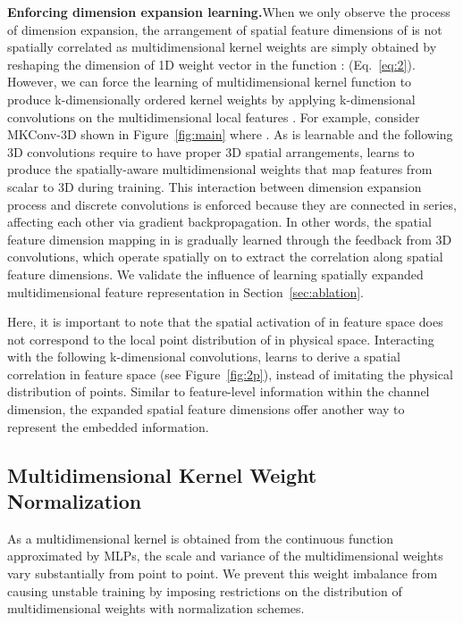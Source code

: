 \documentclass[preprint,12pt]{elsarticle}
\begin{document}
\medskip
\noindent\textbf{Enforcing dimension expansion learning.}\hspace{0.3cm}When we only observe the process of dimension expansion, the arrangement of spatial feature dimensions of  is not spatially correlated as multidimensional kernel weights are simply obtained by reshaping the dimension of 1D weight vector in the function  :  (Eq.~\ref{eq:2}). However, we can force the learning of multidimensional kernel function  to produce k-dimensionally ordered kernel weights by applying k-dimensional convolutions on the multidimensional local features . For example, consider MKConv-3D shown in Figure~\ref{fig:main} where . As  is learnable and the following 3D convolutions require  to have proper 3D spatial arrangements,  learns to produce the spatially-aware multidimensional weights that map features from scalar to 3D during training. This interaction between dimension expansion process and discrete convolutions is enforced because they are connected in series, affecting each other via gradient backpropagation. In other words, the spatial feature dimension mapping in  is gradually learned through the feedback from 3D convolutions, which operate spatially on  to extract the correlation along spatial feature dimensions. We validate the influence of learning spatially expanded multidimensional feature representation in Section~\ref{sec:ablation}.

Here, it is important to note that the spatial activation of  in feature space does not correspond to the local point distribution of  in physical space. Interacting with the following k-dimensional convolutions,  learns to derive a spatial correlation in feature space (see Figure~\ref{fig:2p}), instead of imitating the physical distribution of points. Similar to feature-level information within the channel dimension, the expanded spatial feature dimensions offer another way to represent the embedded information.

\subsection{Multidimensional Kernel Weight Normalization}
As a multidimensional kernel is obtained from the continuous function  approximated by MLPs, the scale and variance of the multidimensional weights vary substantially from point to point. We prevent this weight imbalance from causing unstable training by imposing restrictions on the distribution of multidimensional weights with normalization schemes. 
\end{document}
